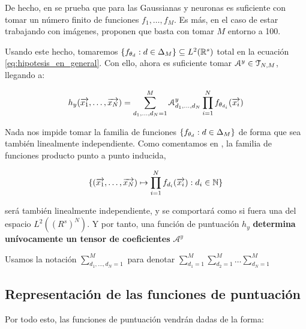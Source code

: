 De hecho, en \cite{matematicas:principal} se prueba que para las Gaussianas y neuronas es suficiente con tomar un número finito de funciones ${f_1, \ldots, f_M}$. Es más, en el caso de estar trabajando con imágenes, proponen que basta con tomar $M$ entorno a 100.

Usando este hecho, tomaremos $\{f_{\theta_d}: d \in \Delta_{M}\} \subseteq L^2(\mathbb{R}^s)$ total en la ecuación \eqref{eq:hipotesis_en_general}. Con ello, ahora es suficiente tomar $\mathcal{A}^y \in \mathcal{T}_{N, M}$, llegando a:

\begin{equation}
    h_y(\overrightarrow{x_1}, \ldots, \overrightarrow{x_N}) = \sum_{d_1, \ldots, d_N = 1}^{M} \mathcal{A}^y_{d_1, \ldots, d_N} \prod_{i = 1}^N f_{\theta_{d_i}}(\overrightarrow{x_i})
\end{equation}

\begin{observacion}

    Nada nos impide tomar la familia de funciones $\{f_{\theta_d}: d \in \Delta_{M}\}$ de forma que sea también linealmente independiente. Como comentamos en , la familia de funciones producto punto a punto inducida,

    \begin{equation}
        \{ (\overrightarrow{x_1}, \ldots, \overrightarrow{x_N}) \mapsto \prod_{i = 1}^N f_{d_i}(\overrightarrow{x_i}): d_i \in \mathbb{N} \}
    \end{equation}

    será también linealmente independiente, y se comportará como si fuera una  del espacio $L^2((R^s)^N)$. Y por tanto, una función de puntuación $h_y$ \textbf{determina unívocamente un tensor de coeficientes} $\mathcal{A}^y$

\end{observacion}

\begin{observacion}
    Usamos la notación $\sum_{d_1, \ldots, d_N = 1}^{M}$ para denotar $\sum_{d_1 = 1}^{M} \sum_{d_2 = 1}^{M} \ldots \sum_{d_N = 1}^{M}$
\end{observacion}

\subsection{Representación de las funciones de puntuación} \label{sec:repr_funciones_puntuacion}

Por todo esto, las funciones de puntuación vendrán dadas de la forma:

